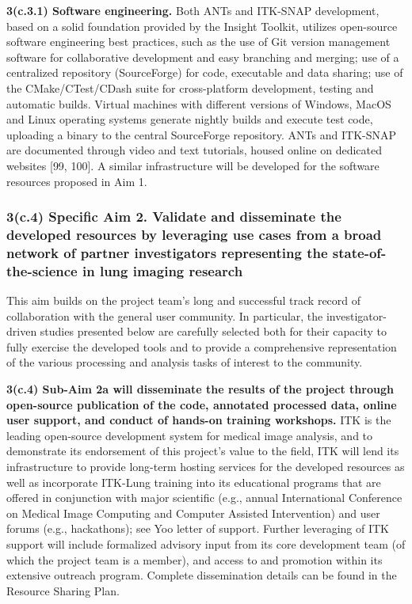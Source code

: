 \documentclass[11pt,]{article}
\begin{document}
\textbf{3(c.3.1) Software engineering.} Both ANTs and ITK-SNAP
development, based on a solid foundation provided by the Insight
Toolkit, utilizes open-source software engineering best practices, such
as the use of Git version management software for collaborative
development and easy branching and merging; use of a centralized
repository (SourceForge) for code, executable and data sharing; use of
the CMake/CTest/CDash suite for cross-platform development, testing and
automatic builds. Virtual machines with different versions of Windows,
MacOS and Linux operating systems generate nightly builds and execute
test code, uploading a binary to the central SourceForge repository.
ANTs and ITK-SNAP are documented through video and text tutorials,
housed online on dedicated websites {[}99, 100{]}. A similar
infrastructure will be developed for the software resources proposed in
Aim 1.

\subsubsection{3(c.4) \textbf{Specific Aim 2.} Validate and disseminate
the developed resources by leveraging use cases from a broad network of
partner investigators representing the state-of-the-science in lung
imaging
research}\label{c.4-specific-aim-2.-validate-and-disseminate-the-developed-resources-by-leveraging-use-cases-from-a-broad-network-of-partner-investigators-representing-the-state-of-the-science-in-lung-imaging-research}

This aim builds on the project team's long and successful track record
of collaboration with the general user community. In particular, the
investigator-driven studies presented below are carefully selected both
for their capacity to fully exercise the developed tools and to provide
a comprehensive representation of the various processing and analysis
tasks of interest to the community.

\textbf{3(c.4) Sub-Aim 2a will disseminate the results of the project
through open-source publication of the code, annotated processed data,
online user support, and conduct of hands-on training workshops.} ITK is
the leading open-source development system for medical image analysis,
and to demonstrate its endorsement of this project's value to the field,
ITK will lend its infrastructure to provide long-term hosting services
for the developed resources as well as incorporate ITK-Lung training
into its educational programs that are offered in conjunction with major
scientific (e.g., annual International Conference on Medical Image
Computing and Computer Assisted Intervention) and user forums (e.g.,
hackathons); see Yoo letter of support. Further leveraging of ITK
support will include formalized advisory input from its core development
team (of which the project team is a member), and access to and
promotion within its extensive outreach program. Complete dissemination
details can be found in the Resource Sharing Plan.
\end{document}

